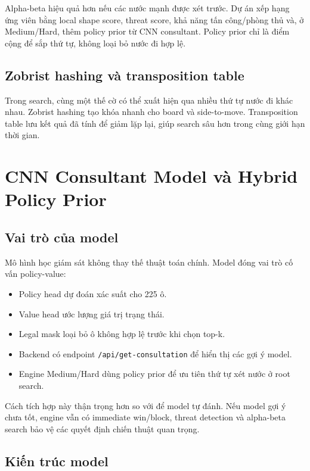 \documentclass[12pt,a4paper]{article}
\begin{document}
Alpha-beta hiệu quả hơn nếu các nước mạnh được xét trước. Dự án xếp hạng ứng viên bằng local shape score, threat score, khả năng tấn công/phòng thủ và, ở Medium/Hard, thêm policy prior từ CNN consultant. Policy prior chỉ là điểm cộng để sắp thứ tự, không loại bỏ nước đi hợp lệ.

\subsection{Zobrist hashing và transposition table}

Trong search, cùng một thế cờ có thể xuất hiện qua nhiều thứ tự nước đi khác nhau. Zobrist hashing tạo khóa nhanh cho board và side-to-move. Transposition table lưu kết quả đã tính để giảm lặp lại, giúp search sâu hơn trong cùng giới hạn thời gian.

\section{CNN Consultant Model và Hybrid Policy Prior}
\label{sec:consultant}

\subsection{Vai trò của model}

Mô hình học giám sát không thay thế thuật toán chính. Model đóng vai trò cố vấn policy-value:

\begin{itemize}[leftmargin=*]
  \item Policy head dự đoán xác suất cho 225 ô.
  \item Value head ước lượng giá trị trạng thái.
  \item Legal mask loại bỏ ô không hợp lệ trước khi chọn top-k.
  \item Backend có endpoint \texttt{/api/get-consultation} để hiển thị các gợi ý model.
  \item Engine Medium/Hard dùng policy prior để ưu tiên thứ tự xét nước ở root search.
\end{itemize}

Cách tích hợp này thận trọng hơn so với để model tự đánh. Nếu model gợi ý chưa tốt, engine vẫn có immediate win/block, threat detection và alpha-beta search bảo vệ các quyết định chiến thuật quan trọng.

\subsection{Kiến trúc model}
\end{document}
